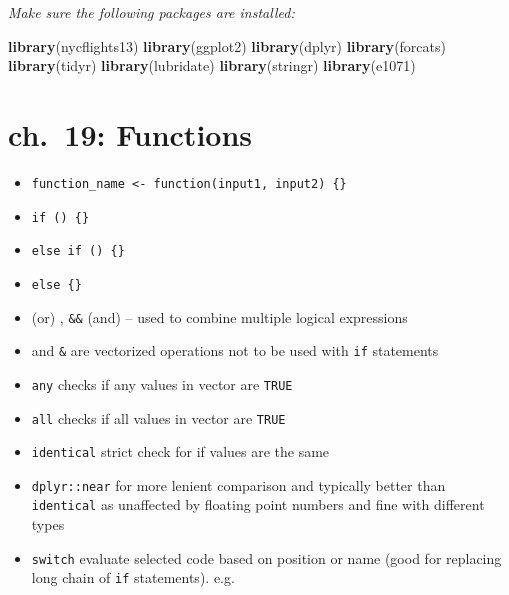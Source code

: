 \documentclass[]{book}
\newenvironment{Shaded}{\begin{snugshade}}{\end{snugshade}}
\newcommand{\KeywordTok}[1]{\textcolor[rgb]{0.13,0.29,0.53}{\textbf{#1}}}
\newcommand{\NormalTok}[1]{#1}
\providecommand{\tightlist}{%
  \setlength{\itemsep}{0pt}\setlength{\parskip}{0pt}}
\theoremstyle{definition}
\theoremstyle{definition}
\theoremstyle{definition}
\theoremstyle{remark}
\begin{document}
\emph{Make sure the following packages are installed:}

\begin{Shaded}
\begin{Highlighting}[]
\KeywordTok{library}\NormalTok{(nycflights13)}
\KeywordTok{library}\NormalTok{(ggplot2)}
\KeywordTok{library}\NormalTok{(dplyr)}
\KeywordTok{library}\NormalTok{(forcats)}
\KeywordTok{library}\NormalTok{(tidyr)}
\KeywordTok{library}\NormalTok{(lubridate)}
\KeywordTok{library}\NormalTok{(stringr)}
\KeywordTok{library}\NormalTok{(e1071)}
\end{Highlighting}
\end{Shaded}

\hypertarget{ch.-19-functions}{%
\chapter{ch.~19: Functions}\label{ch.-19-functions}}

\begin{itemize}
\tightlist
\item
  \texttt{function\_name\ \textless{}-\ function(input1,\ input2)\ \{\}}
\item
  \texttt{if\ ()\ \{\}}
\item
  \texttt{else\ if\ ()\ \{\}}
\item
  \texttt{else\ \{\}}
\item
  \texttt{\textbar{}\textbar{}} (or) , \texttt{\&\&} (and) -- used to
  combine multiple logical expressions
\item
  \texttt{\textbar{}} and \texttt{\&} are vectorized operations not to
  be used with \texttt{if} statements
\item
  \texttt{any} checks if any values in vector are \texttt{TRUE}
\item
  \texttt{all} checks if all values in vector are \texttt{TRUE}
\item
  \texttt{identical} strict check for if values are the same
\item
  \texttt{dplyr::near} for more lenient comparison and typically better
  than \texttt{identical} as unaffected by floating point numbers and
  fine with different types
\item
  \texttt{switch} evaluate selected code based on position or name (good
  for replacing long chain of \texttt{if} statements). e.g.~
\end{itemize}
\end{document}
